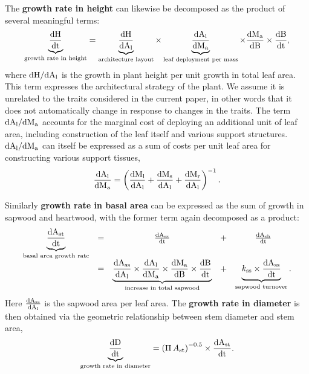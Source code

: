 \documentclass[a4paper,11pt]{article}
\begin{document}
The \textbf{growth rate in height} can likewise be decomposed as the product of several meaningful terms:
\begin{equation}\label{eq:eq2}
\underbrace{\frac{\rm{d} H}{\rm{d} t}}_{\text{growth rate in height}} = \underbrace{\frac{\rm{d} H}{\rm{d} A_{\rm l}}}_{\text{architecture layout}} \times \underbrace{{\frac{\rm{d} A_{\rm l}}{\rm{d} M_{\rm a} }}}_{\text{leaf deployment per mass}} \times {\frac{\ensuremath{\rm{d}}M_{\rm a} }{\ensuremath{\rm{d}}B}} \times {\frac{\ensuremath{\rm{d}}B}{\ensuremath{\rm{d}}t}},
\end{equation}
where $\rm{d} H / \rm{d} A_{\rm l}$ is the growth in plant height
per unit growth in total leaf area. This term expresses the architectural
strategy of the plant. We assume it is unrelated to the traits considered in the current paper, in other words that it does not automatically change in response to changes in the traits. The term $\rm{d} A_{\rm l} / \rm{d} M_{\rm a} $
accounts for the marginal cost of deploying an additional unit of leaf
area, including construction of the leaf itself and various support
structures.  $\rm{d} A_{\rm l} / \rm{d} M_{\rm a} $
can itself be expressed as a sum of costs per unit leaf
area for constructing various support tissues,
\begin{equation}\label{eq:daldmt}
\frac{\rm{d} A_{\rm l}}{\rm{d} M_{\rm a} }
= \left(\frac{\rm{d} M_{\rm l}}{\rm{d} A_{\rm l}}
 +  \frac{\rm{d} M_{\rm s}}{\rm{d} A_{\rm l}} + \frac{\rm{d} M_{\rm r}}{\rm{d} A_{\rm l}}\right)^{-1}.
\end{equation}

Similarly \textbf{growth rate in basal area} can be expressed as the sum of growth in sapwood and heartwood, with the former term again decomposed as a product:
\begin{equation}\label{eq:eq3}
\begin{array}{ccccc}
\underbrace{{\frac{\rm{d} A_{\rm st}}{\rm{d} t}}}_{\text{basal area growth rate}} &=& \frac{\rm{d} A_{\rm ss}}{\rm{d} t} &+& \frac{\rm{d} A_{\rm sh}}{\rm{d} t} \\
&=& \underbrace{\frac{\rm{d} A_{\rm ss}}{\rm{d} A_{\rm l}}  \times {\frac{\ensuremath{\rm{d}}A_{\rm l}}{\ensuremath{\rm{d}}M_{\rm a} }} \times  {\frac{\ensuremath{\rm{d}}M_{\rm a} }{\ensuremath{\rm{d}}B}} \times {\frac{\ensuremath{\rm{d}}B}{\ensuremath{\rm{d}}t}}}_{\text{increase in total sapwood}} &+&  \underbrace{k_{\rm ss} \times \frac{\rm{d} A_{\rm ss}}{\rm{d} t}}_{\text{sapwood turnover}}.\\
\end{array}
\end{equation}
Here $\frac{\rm{d} A_{\rm ss}}{\rm{d} A_{\rm l}} $ is the  sapwood area per leaf area. The \textbf{growth rate in diameter} is then obtained via the geometric relationship between stem diameter and stem area,
\begin{equation}\label{eq:eq4}
\underbrace{\frac{\rm{d} D}{\rm{d} t}}_{\text{growth rate in diameter}} = \left(\Pi \, A_{\rm st}\right)^{-0.5} \times {\frac{\ensuremath{\rm{d}}A_{\rm st}}{\ensuremath{\rm{d}}t}}.
\end{equation}
\end{document}
